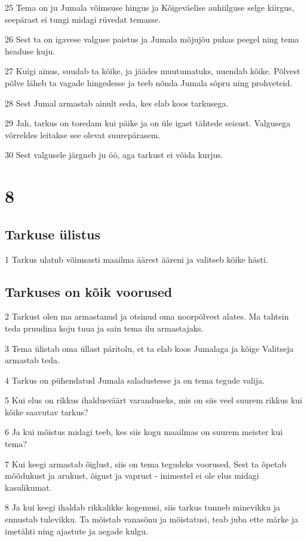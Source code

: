 \par 25 Tema on ju Jumala võimsuse hingus ja Kõigeväelise auhiilguse selge kiirgus, seepärast ei tungi midagi rüvedat temasse.
\par 26 Sest ta on igavese valguse paistus ja Jumala mõjujõu puhas peegel ning tema headuse kuju.
\par 27 Kuigi ainus, suudab ta kõike, ja jäädes muutumatuks, uuendab kõike. Põlvest põlve läheb ta vagade hingedesse ja teeb nõnda Jumala sõpru ning prohveteid.
\par 28 Sest Jumal armastab ainult seda, kes elab koos tarkusega.
\par 29 Jah, tarkus on toredam kui päike ja on üle igast tähtede seisust. Valgusega võrreldes leitakse see olevat suurepärasem.
\par 30 Sest valgusele järgneb ju öö, aga tarkust ei võida kurjus. 

\chapter{8}

\section*{Tarkuse ülistus}

\par 1 Tarkus ulatub võimsasti maailma äärest ääreni ja valitseb kõike hästi. 

\section*{Tarkuses on kõik voorused}

\par 2 Tarkust olen ma armastanud ja otsinud oma noorpõlvest alates. Ma tahtsin teda pruudina koju tuua ja sain tema ilu armastajaks.
\par 3 Tema ülistab oma üllast päritolu, et ta elab koos Jumalaga ja kõige Valitseja armastab teda.
\par 4 Tarkus on pühendatud Jumala saladustesse ja on tema tegude valija.
\par 5 Kui elus on rikkus ihaldusväärt varanduseks, mis on siis veel suurem rikkus kui kõike saavutav tarkus?
\par 6 Ja kui mõistus midagi teeb, kes siis kogu maailmas on suurem meister kui tema?
\par 7 Kui keegi armastab õiglust, siis on tema tegudeks voorused. Sest ta õpetab mõõdukust ja arukust, õigust ja vaprust - inimestel ei ole elus midagi kasulikumat.
\par 8 Ja kui keegi ihaldab rikkalikke kogemusi, siis tarkus tunneb minevikku ja ennustab tulevikku. Ta mõistab vanasõnu ja mõistatusi, teab juba ette märke ja imetähti ning ajastute ja aegade kulgu. 

